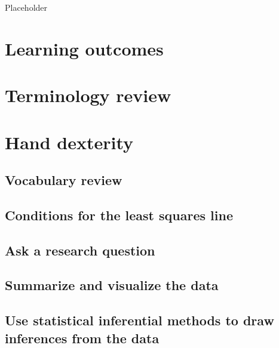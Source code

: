 \documentclass[
]{report}
\begin{document}
Placeholder

\hypertarget{learning-outcomes}{%
\section{Learning outcomes}\label{learning-outcomes}}

\hypertarget{terminology-review}{%
\section{Terminology review}\label{terminology-review}}

\hypertarget{hand-dexterity-1}{%
\section{Hand dexterity}\label{hand-dexterity-1}}

\hypertarget{vocabulary-review}{%
\subsection{Vocabulary review}\label{vocabulary-review}}

\hypertarget{conditions-for-the-least-squares-line}{%
\subsection{Conditions for the least squares line}\label{conditions-for-the-least-squares-line}}

\hypertarget{ask-a-research-question}{%
\subsection{Ask a research question}\label{ask-a-research-question}}

\hypertarget{summarize-and-visualize-the-data}{%
\subsection{Summarize and visualize the data}\label{summarize-and-visualize-the-data}}

\hypertarget{use-statistical-inferential-methods-to-draw-inferences-from-the-data}{%
\subsection{Use statistical inferential methods to draw inferences from the data}\label{use-statistical-inferential-methods-to-draw-inferences-from-the-data}}
\end{document}
